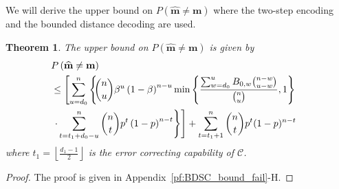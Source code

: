 \documentclass[10pt,twocolumn,twoside,submit]{JCNtran}
\newtheorem{theorem}{Theorem}
\newtheorem{corollary}[theorem]{Corollary}
\begin{document}
	We will derive the upper bound on $P\left( \widehat{\mathbf{m}} \ne \mathbf{m} \right)$ where the two-step encoding and the bounded distance decoding are used. 
	
	\begin{theorem}\label{thm:BDSC_bound_fail} The upper bound on $P\left( \widehat{\mathbf{m}} \ne \mathbf{m} \right)$ is given by
		\begin{align}
		\hspace{-3mm} & P\left( \widehat{\mathbf{m}}\ne \mathbf{m} \right) \nonumber  \\
		\hspace{-3mm} & \le \left[ \sum_{u=d_0}^{n} \left\{ \hspace{-1mm} { \binom{n}{u} \beta^{u} \left( 1 - \beta \right)^{n-u}} \min \left\{ \frac{ \sum_{w=d_0}^{u}{B_{0,w} \binom{n-w}{u-w}}}{\binom{n}{u}}, 1\right\}  \right. \right. \nonumber\\
		\hspace{-3mm} & \left. \left.\cdot \sum_{t=t_1 + d_0 - u}^{n}{\binom{n}{t} p^{t} \left( 1 - p \right)^{n-t}} \right\} \right] + \sum_{t=t_1 + 1}^{n}{\binom{n}{t}p^t (1-p)^{n-t}}
		\label{eq:BDSC_bound_fail}
		\end{align}
		where $t_1 = \left\lfloor \frac{d_1 - 1}{2} \right\rfloor$ is the error correcting capability of $\mathcal{C}$.
	\end{theorem}
	\begin{proof}The proof is given in Appendix~\ref{pf:BDSC_bound_fail}-H.
	\end{proof}
	
	
\end{document}
